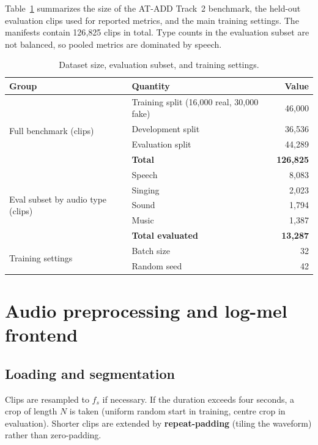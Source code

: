 Table~\ref{tab:dataset-eval} summarizes the size of the AT-ADD Track~2 benchmark, the held-out evaluation clips used for reported metrics, and the main training settings. The manifests contain 126{,}825 clips in total. Type counts in the evaluation subset are not balanced, so pooled metrics are dominated by speech.

\begin{table}[htbp]
\centering
\caption{Dataset size, evaluation subset, and training settings.}
\label{tab:dataset-eval}
\begin{tabular}{@{}llr@{}}
\toprule
\textbf{Group} & \textbf{Quantity} & \textbf{Value} \\
\midrule
\multirow{4}{*}{Full benchmark (clips)}
  & Training split (16{,}000 real, 30{,}000 fake) & 46{,}000 \\
  & Development split & 36{,}536 \\
  & Evaluation split & 44{,}289 \\
  & \textbf{Total} & \textbf{126{,}825} \\
\midrule
\multirow{5}{*}{Eval subset by audio type (clips)}
  & Speech & 8{,}083 \\
  & Singing & 2{,}023 \\
  & Sound & 1{,}794 \\
  & Music & 1{,}387 \\
  & \textbf{Total evaluated} & \textbf{13{,}287} \\
\midrule
\multirow{2}{*}{Training settings}
  & Batch size & 32 \\
  & Random seed & 42 \\
\bottomrule
\end{tabular}
\end{table}

\section{Audio preprocessing and log-mel frontend}
\label{sec:frontend}

\subsection{Loading and segmentation}

Clips are resampled to $f_s$ if necessary. If the duration exceeds four seconds, a crop of length $N$ is taken (uniform random start in training, centre crop in evaluation). Shorter clips are extended by \textbf{repeat-padding} (tiling the waveform) rather than zero-padding.

